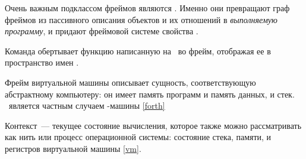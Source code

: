 \clearpage
{}\secdown


\medskip\noindent
Очень важным подклассом фреймов являются . Именно они
превращают граф фреймов из пассивного описания объектов и их отношений в
\emph{выполняемую программу}, и придают фреймовой системе свойства
.

\clearpage
{}\label{cmd}


\medskip\noindent
Команда обертывает функцию написанную на \py\ во фрейм, отображая ее в
пространство имен \metal.

\clearpage
{}\label{vm}\label{FVM}


\medskip\noindent
Фрейм виртуальной машины описывает сущность, соответствующую абстрактному
компьютеру: он имеет память программ и память данных, и стек. \ является частным случаем \F-машины
\ref{forth}

\label{context}

 
\medskip\noindent
Контекст\ --- текущее состояние вычисления, которое также можно рассматривать
как нить или процесс операционной системы: состояние стека, памяти, и регистров
виртуальной машины \ref{vm}.

\secup
